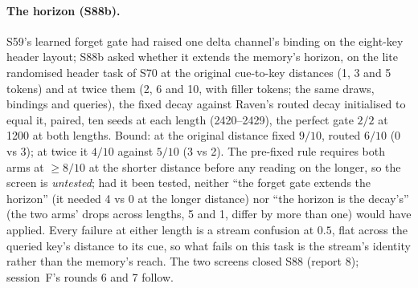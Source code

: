 \documentclass[11pt]{article}
\begin{document}
\paragraph{The horizon (S88b).} S59's learned forget gate had raised one delta channel's binding on the eight-key header layout; S88b asked whether it extends the memory's horizon, on the lite randomised header task of S70 at the original cue-to-key distances (1, 3 and 5 tokens) and at twice them (2, 6 and 10, with filler tokens; the same draws, bindings and queries), the fixed decay against Raven's routed decay initialised to equal it, paired, ten seeds at each length (2420--2429), the perfect gate $2/2$ at 1200 at both lengths. Bound: at the original distance fixed $9/10$, routed $6/10$ (0 vs 3); at twice it $4/10$ against $5/10$ (3 vs 2). The pre-fixed rule requires both arms at $\geq 8/10$ at the shorter distance before any reading on the longer, so the screen is \emph{untested}; had it been tested, neither ``the forget gate extends the horizon'' (it needed 4 vs 0 at the longer distance) nor ``the horizon is the decay's'' (the two arms' drops across lengths, 5 and 1, differ by more than one) would have applied. Every failure at either length is a stream confusion at $0.5$, flat across the queried key's distance to its cue, so what fails on this task is the stream's identity rather than the memory's reach. The two screens closed S88 (report 8); session~F's rounds 6 and 7 follow.
\end{document}
